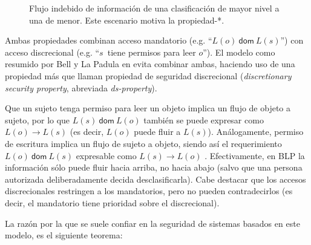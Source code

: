 \documentclass{article}
\theoremstyle{definition}
\begin{document}
\begin{figure}[htp]
  \centering
  \begin{minipage}{.7\textwidth}
  \centering
  \caption{Flujo indebido de información de una clasificación de
  mayor nivel a una de menor. Este escenario motiva la propiedad-*.\label{fig:star} }
  \end{minipage}
\end{figure}
\hyphenchar{} %
    
Ambas propiedades combinan acceso mandatorio
(e.g. ``$L(o)~\mathsf{dom}~L(s)$'')
con acceso discrecional (e.g. ``$s$~tiene permisos para leer $o$'').
El modelo como resumido por Bell y La Padula en \cite{BLP76} evita combinar
ambas, haciendo uso de una propiedad más que llaman propiedad de seguridad
discrecional (\textit{discretionary security property}, abreviada
\textit{ds-property}).

Que un sujeto tenga permiso para leer un objeto implica un flujo de
objeto a sujeto, por lo que $L(s)~\mathsf{dom}~L(o)$ también se puede expresar
como $L(o)\to L(s)$ (es decir, $L(o)$ puede fluir a $L(s)$). Análogamente,
permiso de escritura implica un flujo de sujeto a objeto, siendo así el
requerimiento $L(o)~\mathsf{dom}~L(s)$ expresable como $L(s)\to
L(o)$ \cite{Sandhu93}.
Efectivamente, en BLP la información sólo puede fluir hacia arriba, no hacia abajo (salvo que una persona autorizada deliberadamente decida desclasificarla). Cabe destacar que los accesos discrecionales restringen a los mandatorios, pero
no pueden contradecirlos (es decir, el mandatorio tiene prioridad sobre el
discrecional).

La razón por la que se suele confiar en la seguridad de sistemas basados en
este modelo, es el siguiente teorema:
\end{document}
